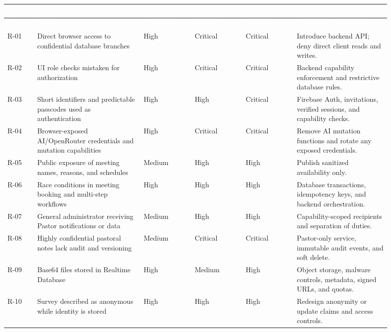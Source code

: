 \documentclass[11pt,a4paper,oneside]{report}
\begin{document}
\begin{longtable}{@{}p{0.07\linewidth} p{0.25\linewidth} p{0.12\linewidth} p{0.12\linewidth} p{0.12\linewidth} p{0.22\linewidth}@{}}
\toprule
\rowcolor{primary}
\textcolor{white}{\textbf{ID}} & \textcolor{white}{\textbf{Risk}} & \textcolor{white}{\textbf{Likelihood}} & \textcolor{white}{\textbf{Impact}} & \textcolor{white}{\textbf{Priority}} & \textcolor{white}{\textbf{Required Treatment}} \\
\midrule
\endfirsthead
\toprule
\rowcolor{primary}
\textcolor{white}{\textbf{ID}} & \textcolor{white}{\textbf{Risk}} & \textcolor{white}{\textbf{Likelihood}} & \textcolor{white}{\textbf{Impact}} & \textcolor{white}{\textbf{Priority}} & \textcolor{white}{\textbf{Required Treatment}} \\
\midrule
\endhead
R-01 & Direct browser access to confidential database branches & High & Critical & Critical & Introduce backend API; deny direct client reads and writes. \\
R-02 & UI role checks mistaken for authorization & High & Critical & Critical & Backend capability enforcement and restrictive database rules. \\
R-03 & Short identifiers and predictable passcodes used as authentication & High & High & Critical & Firebase Auth, invitations, verified sessions, and capability checks. \\
R-04 & Browser-exposed AI/OpenRouter credentials and mutation capabilities & High & Critical & Critical & Remove AI mutation functions and rotate any exposed credentials. \\
R-05 & Public exposure of meeting names, reasons, and schedules & Medium & High & High & Publish sanitized availability only. \\
R-06 & Race conditions in meeting booking and multi-step workflows & High & High & High & Database transactions, idempotency keys, and backend orchestration. \\
R-07 & General administrator receiving Pastor notifications or data & Medium & High & High & Capability-scoped recipients and separation of duties. \\
R-08 & Highly confidential pastoral notes lack audit and versioning & Medium & Critical & Critical & Pastor-only service, immutable audit events, and soft delete. \\
R-09 & Base64 files stored in Realtime Database & High & Medium & High & Object storage, malware controls, metadata, signed URLs, and quotas. \\
R-10 & Survey described as anonymous while identity is stored & High & High & High & Redesign anonymity or update claims and access controls. \\

\end{longtable}
\end{document}
